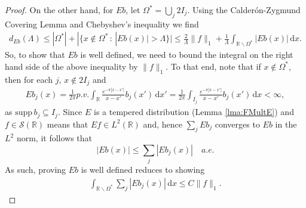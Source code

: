 \documentclass[../dissertation.tex]{subfiles}
\begin{document}
\begin{proof}
    On the other hand, for $Eb$, let $\Omega^* = \bigcup_j 2 I_j$. Using the 
    Calder\'on-Zygmund Covering Lemma and Chebyshev's inequality we find
    \begin{align} \label{eq:dEb}
        d_{Eb}(\Lambda) 
            \leq |\Omega^*| + |\{ x \notin \Omega^* \, : \, |Eb(x)| > \Lambda \}|
            \leq \frac{2}{\Lambda} \|f\|_1 + \frac{1}{\Lambda} 
                \int_{\mathbb R \backslash \Omega^*} |Eb(x)| \, \mathrm{d}x.
    \end{align}
    So, to show that $Eb$ is well defined, we need to bound the integral on the 
    right hand side of the above inequality by $\|f\|_1$. To that end, note that
    if $x \notin \Omega^*$, then for each $j$, $x \notin 2 I_j$ and
    \begin{align*}
        E b_j(x) 
            = \frac{1}{2\pi} 
            	p.v. \int_{\mathbb R} 
            		\frac{e^{-\pi|x - x'|}}{x - x'} b_j(x') 
            	\, \mathrm{d}x'
            = \frac{1}{2\pi} 
            	\int_{I_j} 
            		\frac{e^{-\pi|x - x'|}}{x - x'} b_j(x') 
            	\, \mathrm{d}x 
            < \infty,
    \end{align*}
    as $\text{supp} \, b_j \subseteq I_j$. Since $E$ is a tempered distribution
    (Lemma \ref{lma:FMultE}) and
    $f \in \mathscr S(\mathbb R)$ means that $Ef \in L^2(\mathbb R)$ and, hence
    $\sum_j E b_j$ converges to $Eb$ in the $L^2$ norm, it follows that
    \[
        |Eb(x)| \leq \sum_j |Eb_j(x)| \quad a.e.
    \]
    As such, proving $Eb$ is well defined reduces to showing
    \begin{align}
        \int_{\mathbb R \backslash \Omega^*} \sum_{j} |E b_j(x)| \, \mathrm{d}x 
            \leq C \| f \|_1.
    \end{align}


\end{proof}
\end{document}
